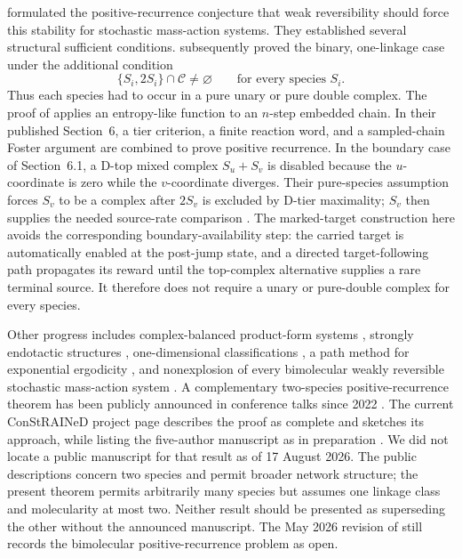 \citet{AndersonKim2018} formulated the positive-recurrence conjecture that
weak reversibility should force this stability for stochastic mass-action
systems.  They established several structural sufficient conditions.
\citet{AndersonCappellettiKim2020} subsequently proved the binary,
one-linkage case under the additional condition
\begin{equation}\label{eq:ACK-condition}
  \{S_i,2S_i\}\cap\mathcal C\ne\varnothing
  \qquad\text{for every species }S_i.
\end{equation}
Thus each species had to occur in a pure unary or pure double complex.  The
proof of \citet{AndersonCappellettiKim2020} applies an entropy-like function
to an \(n\)-step embedded chain.  In their published Section~6, a tier
criterion, a finite reaction word, and a sampled-chain Foster argument are
combined to prove positive recurrence.  In the boundary case of
Section~6.1, a D-top mixed complex \(S_u+S_v\) is disabled because the
\(u\)-coordinate is zero while the \(v\)-coordinate diverges.  Their
pure-species assumption forces \(S_v\) to be a complex after \(2S_v\) is
excluded by D-tier maximality; \(S_v\) then supplies the needed source-rate
comparison \citep[Section~6, especially Section~6.1]{AndersonCappellettiKim2020}.
The marked-target construction here avoids the corresponding
boundary-availability step: the carried target is automatically enabled at
the post-jump state, and a directed target-following path propagates its
reward until the top-complex alternative supplies a rare terminal source.  It
therefore does not require a unary or pure-double complex for every species.

Other progress includes complex-balanced product-form systems
\citep{AndersonCraciunKurtz2010}, strongly endotactic structures
\citep{AndersonCappellettiKimNguyen2020}, one-dimensional classifications
\citep{WiufXu2023}, a path method for exponential ergodicity
\citep{AndersonCappellettiFanKim2025}, and nonexplosion of every bimolecular
weakly reversible stochastic mass-action system \citep{Xu2026}.  A complementary two-species
positive-recurrence theorem has been publicly announced in conference talks
since 2022 \citep{Agazzi2022Talk,Agazzi2025Talk}.  The current ConStRAINeD
project page describes the proof as complete and sketches its approach, while
listing the five-author manuscript as in preparation
\citep{ConStRAINeDResults}.  We did not locate a public manuscript for that
result as of 17 August 2026.  The public descriptions concern two species and
permit broader network structure; the present theorem permits arbitrarily many
species but assumes one linkage class and molecularity at most two.  Neither
result should be presented as superseding the other without the announced
manuscript.  The May 2026
revision of \citet{Xu2026} still records the bimolecular positive-recurrence
problem as open.

